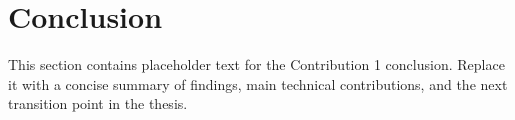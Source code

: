 \section{Conclusion}
\label{sec::contrib1::conclusion}

This section contains placeholder text for the Contribution 1 conclusion. Replace it with a concise summary of findings, main technical contributions, and the next transition point in the thesis.
